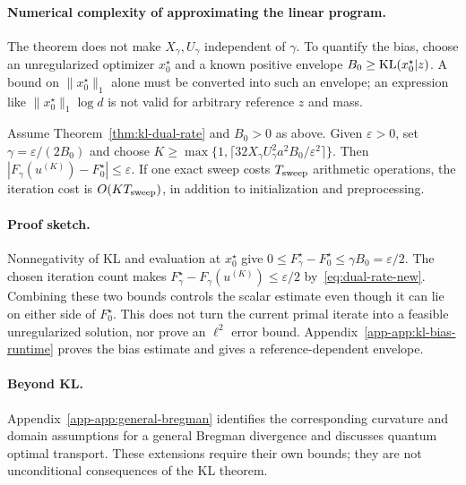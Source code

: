 \paragraph{Numerical complexity of approximating the linear program.}
The theorem does not make $X_\gamma,U_\gamma$ independent of $\gamma$. To quantify the bias, choose an unregularized optimizer $x_0^\star$ and a known positive envelope $B_0\geq\mathrm{KL}(x_0^\star|z)$. A bound on $\|x_0^\star\|_1$ alone must be converted into such an envelope; an expression like $\|x_0^\star\|_1\log d$ is not valid for arbitrary reference $z$ and mass.
\begin{theorem}\label{thm:approx-linprog}
Assume Theorem~\ref{thm:kl-dual-rate} and $B_0>0$ as above. Given $\varepsilon>0$, set $\gamma=\varepsilon/(2B_0)$ and choose
$K\geq\max\{1,\lceil32X_\gamma U_\gamma^2a^2 B_0/\varepsilon^2\rceil\}$.
Then $|F_\gamma(u^{(K)})-F_0^\star|\leq\varepsilon$.
If one exact sweep costs $T_{\rm sweep}$ arithmetic operations, the iteration cost is $O(KT_{\rm sweep})$, in addition to initialization and preprocessing.
\end{theorem}
\paragraph{Proof sketch.}
Nonnegativity of KL and evaluation at $x_0^\star$ give $0\leq F_\gamma^\star-F_0^\star\leq\gamma B_0=\varepsilon/2$. The chosen iteration count makes $F_\gamma^\star-F_\gamma(u^{(K)})\leq\varepsilon/2$ by~\eqref{eq:dual-rate-new}. Combining these two bounds controls the scalar estimate even though it can lie on either side of $F_0^\star$. This does not turn the current primal iterate into a feasible unregularized solution, nor prove an $\ell^2$ error bound. Appendix~\ref{app-app:kl-bias-runtime} proves the bias estimate and gives a reference-dependent envelope.

\paragraph{Beyond KL.}
Appendix~\ref{app-app:general-bregman} identifies the corresponding curvature and domain assumptions for a general Bregman divergence and discusses quantum optimal transport. These extensions require their own bounds; they are not unconditional consequences of the KL theorem.
